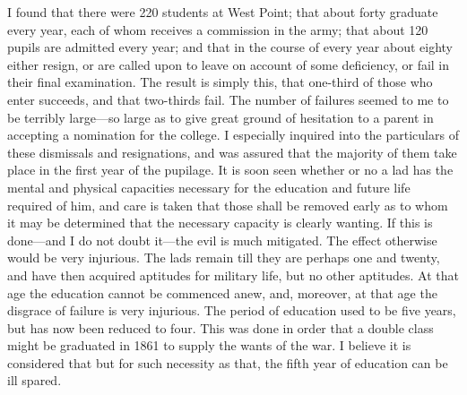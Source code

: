 I found that there were 220 students at West Point; that about
forty graduate every year, each of whom receives a commission in
the army; that about 120 pupils are admitted every year; and that
in the course of every year about eighty either resign, or are
called upon to leave on account of some deficiency, or fail in
their final examination.  The result is simply this, that one-third
of those who enter succeeds, and that two-thirds fail.  The number
of failures seemed to me to be terribly large---so large as to give
great ground of hesitation to a parent in accepting a nomination
for the college.  I especially inquired into the particulars of
these dismissals and resignations, and was assured that the
majority of them take place in the first year of the pupilage.  It
is soon seen whether or no a lad has the mental and physical
capacities necessary for the education and future life required of
him, and care is taken that those shall be removed early as to whom
it may be determined that the necessary capacity is clearly
wanting.  If this is done---and I do not doubt it---the evil is much
mitigated.  The effect otherwise would be very injurious.  The lads
remain till they are perhaps one and twenty, and have then acquired
aptitudes for military life, but no other aptitudes.  At that age
the education cannot be commenced anew, and, moreover, at that age
the disgrace of failure is very injurious.  The period of education
used to be five years, but has now been reduced to four.  This was
done in order that a double class might be graduated in 1861 to
supply the wants of the war.  I believe it is considered that but
for such necessity as that, the fifth year of education can be ill
spared.

